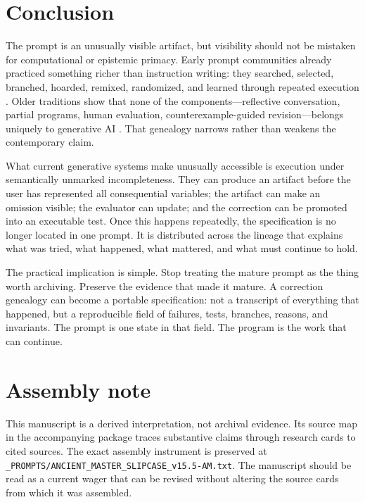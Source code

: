 \documentclass[11pt]{article}
\begin{document}
\section{Conclusion}

The prompt is an unusually visible artifact, but visibility should not be mistaken for computational or epistemic primacy. Early prompt communities already practiced something richer than instruction writing: they searched, selected, branched, hoarded, remixed, randomized, and learned through repeated execution \cite{sun_hartsoe_ottolin2022_sculptors}. Older traditions show that none of the components---reflective conversation, partial programs, human evaluation, counterexample-guided revision---belongs uniquely to generative AI \cite{schon1992designing,solarlezama2008program,takagi2001interactive,jha2015theory}. That genealogy narrows rather than weakens the contemporary claim.

What current generative systems make unusually accessible is execution under semantically unmarked incompleteness. They can produce an artifact before the user has represented all consequential variables; the artifact can make an omission visible; the evaluator can update; and the correction can be promoted into an executable test. Once this happens repeatedly, the specification is no longer located in one prompt. It is distributed across the lineage that explains what was tried, what happened, what mattered, and what must continue to hold.

The practical implication is simple. Stop treating the mature prompt as the thing worth archiving. Preserve the evidence that made it mature. A correction genealogy can become a portable specification: not a transcript of everything that happened, but a reproducible field of failures, tests, branches, reasons, and invariants. The prompt is one state in that field. The program is the work that can continue.

\section*{Assembly note}
This manuscript is a derived interpretation, not archival evidence. Its source map in the accompanying package traces substantive claims through research cards to cited sources. The exact assembly instrument is preserved at \texttt{\_PROMPTS/ANCIENT\_MASTER\_SLIPCASE\_v15.5-AM.txt}. The manuscript should be read as a current wager that can be revised without altering the source cards from which it was assembled.
\end{document}
